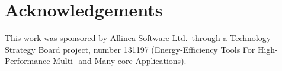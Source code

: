 \section*{Acknowledgements}
\noindent
This work was sponsored by Allinea Software Ltd.\ through a Technology Strategy Board project, number 131197 (Energy-Efficiency Tools For High-Performance Multi- and Many-core Applications).
